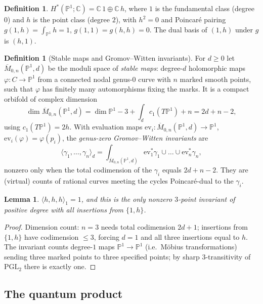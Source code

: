 \documentclass[11pt]{article}
\newtheorem{lemma}[proposition]{Lemma}
\theoremstyle{definition}
\newtheorem{definition}[proposition]{Definition}
\theoremstyle{remark}
\newcommand{\C}{\mathbb{C}}
\newcommand{\PP}{\mathbb{P}}
\begin{document}
\begin{definition}
$H^\ast(\PP^1; \C) = \C\,1 \oplus \C\,h$, where $1$ is the
fundamental class (degree $0$) and $h$ is the point class
(degree $2$), with $h^2 = 0$ and Poincar\'e pairing
$g(1, h) = \int_{\PP^1} h = 1$, $g(1,1) = g(h,h) = 0$. The dual
basis of $(1, h)$ under $g$ is $(h, 1)$.
\end{definition}

\begin{definition}[Stable maps and Gromov--Witten invariants]
For $d \ge 0$ let $\overline{M}_{0,n}(\PP^1, d)$ be the moduli
space of \emph{stable maps}: degree-$d$ holomorphic maps
$\varphi \colon C \to \PP^1$ from a connected nodal genus-$0$ curve
with $n$ marked smooth points, such that $\varphi$ has finitely
many automorphisms fixing the marks. It is a compact orbifold of
complex dimension
\[
  \dim \overline{M}_{0,n}(\PP^1, d)
  = \dim \PP^1 - 3 + \textstyle\int_d c_1(T\PP^1) + n
  = 2d + n - 2,
\]
using $c_1(T\PP^1) = 2h$. With evaluation maps
$\mathrm{ev}_i \colon \overline{M}_{0,n}(\PP^1,d) \to \PP^1$,
$\mathrm{ev}_i(\varphi) = \varphi(p_i)$, the \emph{genus-zero
Gromov--Witten invariants} are
\[
  \langle \gamma_1, \dots, \gamma_n \rangle_d
  = \int_{\overline{M}_{0,n}(\PP^1,d)}
    \mathrm{ev}_1^\ast\gamma_1 \cup \dots \cup
    \mathrm{ev}_n^\ast\gamma_n,
\]
nonzero only when the total codimension of the $\gamma_i$ equals
$2d + n - 2$. They are (virtual) counts of rational curves meeting
the cycles Poincar\'e-dual to the $\gamma_i$.
\end{definition}

\begin{lemma}\label{lem:gw}
$\langle h, h, h \rangle_1 = 1$, and this is the only nonzero
$3$-point invariant of positive degree with all insertions from
$\{1, h\}$.
\end{lemma}

\begin{proof}
Dimension count: $n = 3$ needs total codimension $2d + 1$;
insertions from $\{1, h\}$ have codimension $\le 3$, forcing
$d = 1$ and all three insertions equal to $h$. The invariant counts
degree-$1$ maps $\PP^1 \to \PP^1$ (i.e.\ M\"obius transformations)
sending three marked points to three specified points; by sharp
$3$-transitivity of $\mathrm{PGL}_2$ there is exactly one.
\end{proof}

\subsection{The quantum product}
\end{document}
